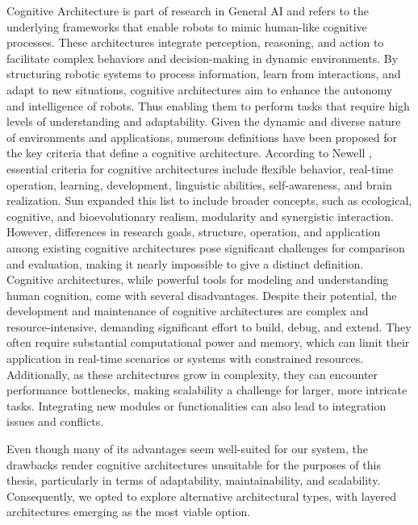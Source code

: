 \documentclass[%
paper=A4,               %
twoside=true,           %
openright,              %
11pt,                   %
bibliography=totoc,     %
titlepage=on,           %
DIV=12,                 %
BCOR=1.5cm,             %
parskip=half,            %
final
]{scrreprt}
\begin{document}
	Cognitive Architecture is part of research in General AI and refers to the underlying frameworks that enable robots to mimic human-like cognitive processes. These architectures integrate perception, reasoning, and action to facilitate complex behaviors and decision-making in dynamic environments. By structuring robotic systems to process information, learn from interactions, and adapt to new situations, cognitive architectures aim to enhance the autonomy and intelligence of robots. Thus enabling them to perform tasks that require high levels of understanding and adaptability. \autocite{kotseruba40YearsCognitive2020} Given the dynamic and diverse nature of environments and applications, numerous definitions have been proposed for the key criteria that define a cognitive architecture. According to Newell \autocite{newellPrecisUnifiedTheories1992}, essential criteria for cognitive architectures include flexible behavior, real-time operation, learning, development, linguistic abilities, self-awareness, and brain realization. Sun \autocite{sunDesiderataCognitiveArchitectures2004} expanded this list to include broader concepts, such as ecological, cognitive, and bioevolutionary realism, modularity and synergistic interaction. However, differences in research goals, structure, operation, and application among existing cognitive architectures pose significant challenges for comparison and evaluation, making it nearly impossible to give a distinct definition.  \autocite{kotseruba40YearsCognitive2020} Cognitive architectures, while powerful tools for modeling and understanding human cognition, come with several disadvantages. Despite their potential, the development and maintenance of cognitive architectures are complex and resource-intensive, demanding significant effort to build, debug, and extend. They often require substantial computational power and memory, which can limit their application in real-time scenarios or systems with constrained resources. Additionally, as these architectures grow in complexity, they can encounter performance bottlenecks, making scalability a challenge for larger, more intricate tasks. Integrating new modules or functionalities can also lead to integration issues and conflicts. \autocite{langleyCognitiveArchitecturesResearch2009, kotseruba40YearsCognitive2020} \newline
	
	Even though many of its advantages seem well-suited for our system, the drawbacks render cognitive architectures unsuitable for the purposes of this thesis, particularly in terms of adaptability, maintainability, and scalability. Consequently, we opted to explore alternative architectural types, with layered architectures emerging as the most viable option.
		
\end{document}
